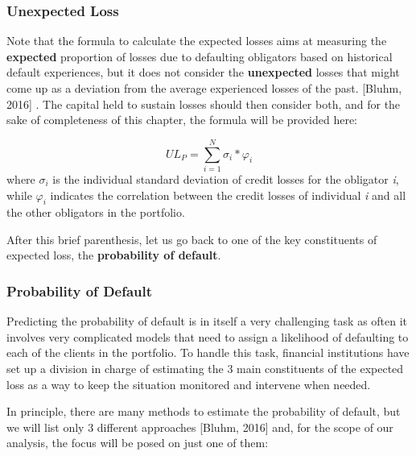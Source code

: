 \documentclass[a4paper,12pt]{article}
\begin{document}
    \subsubsection{Unexpected Loss}
    Note that the formula to calculate the expected losses aims at measuring the \textbf{expected} 
    proportion of losses due to defaulting obligators based on historical default experiences, 
    but it does not consider the \textbf{unexpected} losses that might come up as a deviation 
    from the average experienced losses of the past. [Bluhm, 2016] . 
    The capital held to sustain losses should then consider both, and for the sake of completeness of this chapter, 
    the formula will be provided here:

    \begin{equation}
        UL_{P}=\sum_{i=1}^{N} \sigma_{i}*\varphi_{i}
    \end{equation}
    where $\sigma_{i}$ is the individual standard deviation of credit losses for the obligator \textit{i}, while $\varphi_{i}$ indicates the correlation between the credit losses of individual \textit{i} and all the other obligators in the portfolio.

    After this brief parenthesis, let us go back to one of the key constituents of expected loss, the
    \textbf{probability of default}.

    \subsubsection{Probability of Default}
    \label{sec:calibration}

    Predicting the probability of default is in itself a very challenging task as often it involves very complicated models that need to assign a 
    likelihood of defaulting to each of the clients in the portfolio. To handle this task,  financial institutions have set up a division 
    in charge of estimating the 3 main constituents of the expected loss as a way to keep the situation monitored and intervene when needed. 

    In principle, there are many methods to estimate the probability of default, 
    but we will list only 3 different approaches [Bluhm, 2016]  and, 
    for the scope of our analysis, the focus will be posed on just one of them:
     
\end{document}
